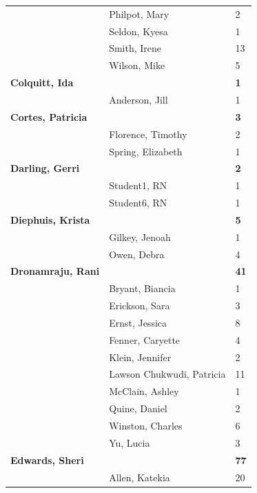 \documentclass{article}\usepackage[]{graphicx}\usepackage[]{color}
\begin{document}
{\begin{longtable} { >{\raggedright}p{}|p{}p{}}
   \rowcolor[gray]{0.90} & Philpot, Mary & 2 \\ 
   & Seldon, Kyesa & 1 \\ 
   & Smith, Irene & 13 \\ 
   & Wilson, Mike & 5 \\ 
   \rowcolor[gray]{0.90}\textbf{Colquitt, Ida} &  & \hspace{2cm}\textbf{1} \\ 
   \rowcolor[gray]{0.90} & Anderson, Jill & 1 \\ 
   \rowcolor[gray]{0.90}\textbf{Cortes, Patricia} &  & \hspace{2cm}\textbf{3} \\ 
   & Florence, Timothy & 2 \\ 
   & Spring, Elizabeth & 1 \\ 
  \textbf{Darling, Gerri} &  & \hspace{2cm}\textbf{2} \\ 
   \rowcolor[gray]{0.90} & Student1, RN & 1 \\ 
   \rowcolor[gray]{0.90} & Student6, RN & 1 \\ 
   \rowcolor[gray]{0.90}\textbf{Diephuis, Krista} &  & \hspace{2cm}\textbf{5} \\ 
   & Gilkey, Jenoah & 1 \\ 
   & Owen, Debra & 4 \\ 
  \textbf{Dronamraju, Rani} &  & \hspace{2cm}\textbf{41} \\ 
   \rowcolor[gray]{0.90} & Bryant, Biancia & 1 \\ 
   \rowcolor[gray]{0.90} & Erickson, Sara & 3 \\ 
   \rowcolor[gray]{0.90} & Ernst, Jessica & 8 \\ 
   & Fenner, Caryette & 4 \\ 
   & Klein, Jennifer & 2 \\ 
   & Lawson Chukwudi, Patricia & 11 \\ 
   \rowcolor[gray]{0.90} & McClain, Ashley & 1 \\ 
   \rowcolor[gray]{0.90} & Quine, Daniel & 2 \\ 
   \rowcolor[gray]{0.90} & Winston, Charles & 6 \\ 
   & Yu, Lucia & 3 \\ 
  \textbf{Edwards, Sheri} &  & \hspace{2cm}\textbf{77} \\ 
   & Allen, Katekia & 20 \\ 

\end{longtable}}
\end{document}
